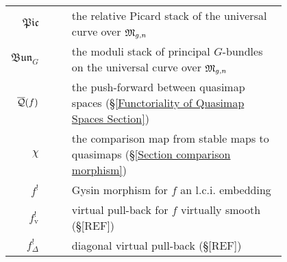 \begin{longtabu}{r c | c p{0.8\linewidth}}
$\mathfrak{Pic}$ & & & the relative Picard stack of the universal curve over $\mathfrak M_{g,n}$ \\
$\mathfrak{Bun}_{G}$ & & & the moduli stack of principal $G$-bundles on the universal curve over $\mathfrak M_{g,n}$ \\
$\overline{\mathcal{Q}}(f)$ & & & the push-forward between quasimap spaces (\S \ref{Functoriality of Quasimap Spaces Section}) \\
$\chi$ & & & the comparison map from stable maps to quasimaps (\S \ref{Section comparison morphism}) \\
$f^!$ & & & Gysin morphism for $f$ an l.c.i. embedding \\
$f^!_{\text{v}}$ & & & virtual pull-back for $f$ virtually smooth (\S [REF]) \\
$f^!_{\Delta}$ & & & diagonal virtual pull-back (\S [REF])
\end{longtabu}